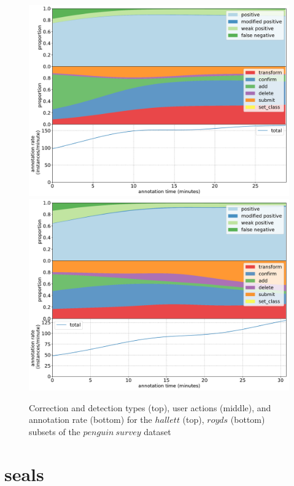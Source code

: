 \pagebreak
\begin{figure}[H]
\begin{minipage}[c][\textheight]{\textwidth}
\centering
\includegraphics[width=1.0\linewidth]{charts/aerial_penguins/action_annotations/hallett_a.pdf}
\includegraphics[width=1.0\linewidth]{charts/aerial_penguins/action_annotations/royds_a.pdf}
\caption{  Correction and detection types (top), user actions (middle), and annotation rate (bottom) for the $hallett$ (top), $royds$ (bottom) subsets of the $penguin\:survey$ dataset }
\label{fig:royds_annotation}
\end{minipage}
\end{figure}


\pagebreak
\section {seals}
\label{sec:seals_details}


